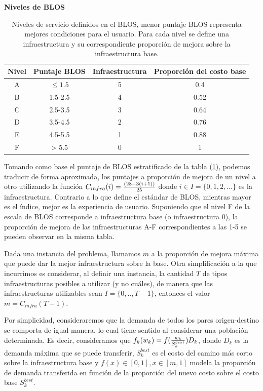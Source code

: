\documentclass{article}
\begin{document}
  \begin{table}[h!]
    \centering
    \caption*{{\bf Niveles de BLOS}}
    \begin{tabular}{cccc}
      \toprule
        Nivel & Puntaje BLOS & Infraestructura & Proporción del costo base \\
      \midrule
        A     & $\leq 1.5$   & 5              & 0.4   \\
        B     & 1.5-2.5      & 4              & 0.52  \\
        C     & 2.5-3.5      & 3              & 0.64  \\
        D     & 3.5-4.5      & 2              & 0.76  \\
        E     & 4.5-5.5      & 1              & 0.88  \\
        F     & > 5.5        & 0              & 1     \\
      \bottomrule
    \end{tabular}
    \caption{Niveles de servicio definidos en el BLOS, menor puntaje BLOS representa mejores condiciones para el usuario. Para cada nivel se define una infraestructura y su correspondiente proporción de mejora sobre la infraestructura base.}\label{table:blosscores}
  \end{table}

  Tomando como base el puntaje de BLOS estratificado de la tabla (\ref{table:blosscores}), podemos traducir de forma aproximada, los puntajes a proporción de mejora de un nivel a otro utilizando la función $C_{infra}(i) = {(28 - 3 (i + 1)) \over 25}$ donde $i \in I = \{0,1,2,\ldots\}$ es la infraestructura. Contrario a lo que define el estándar de BLOS, mientras mayor es el índice, mejor es la experiencia de usuario. Suponiendo que el nivel F de la escala de BLOS corresponde a infraestructura base (o infraestructura 0), la proporción de mejora de las infraestructuras A-F correspondientes a las 1-5 se pueden observar en la misma tabla.

  Dada una instancia del problema, llamamos $m$ a la proporción de mejora máxima que puede dar la mejor infraestructura sobre la base. Otra simplificación a la que incurrimos es considerar, al definir una instancia, la cantidad $T$ de tipos infraestructuras posibles a utilizar (y no cuáles), de manera que las infraestructuras utilizables sean $I = \{0,.., T - 1\}$, entonces el valor $m = C_{infra}(T - 1)$.

  Por simplicidad, consideraremos que la demanda de todos los pares origen-destino se comporta de igual manera, lo cual tiene sentido al considerar una población determinada. Es decir, consideramos que $f_k(w_k) = f({w_k \over S^{best}_k})D_k$, donde $D_k$ es la demanda máxima que se puede transferir, $S^{best}_k$ es el costo del camino más corto sobre la infraestructura base y $f(x) \in [0, 1], x \in [m, 1]$ modela la proporción de demanda transferida en función de la proporción del nuevo costo sobre el costo base $S^{best}_k$.
\end{document}

